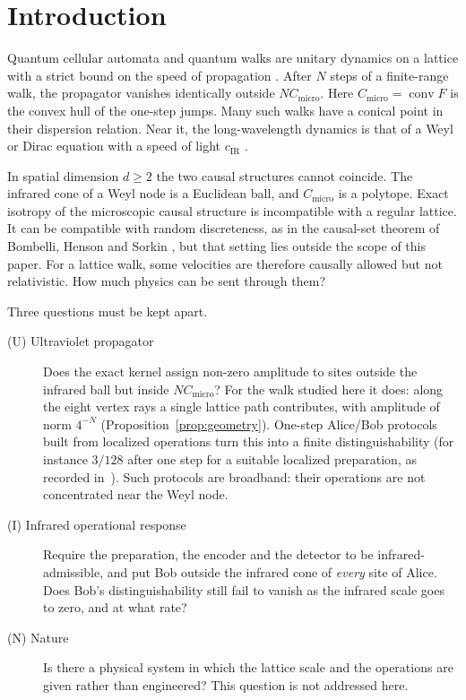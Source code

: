 \documentclass[11pt]{amsart}
\theoremstyle{definition}
\theoremstyle{remark}
\newcommand{\Cmicro}{C_{\mathrm{micro}}}
\newcommand{\cIR}{c_{\mathrm{IR}}}
\begin{document}
\maketitle

\section{Introduction}\label{sec:intro}

Quantum cellular automata and quantum walks are unitary dynamics on a lattice
with a strict bound on the speed of propagation
\cite{SchumacherWerner,Arrighi,Farrelly}.  After $N$ steps of a finite-range
walk, the propagator vanishes identically outside $N\Cmicro$.  Here
$\Cmicro=\operatorname{conv}F$ is the convex hull of the one-step jumps.
Many such walks have a conical point in their dispersion relation.  Near it,
the long-wavelength dynamics is that of a Weyl or Dirac equation with a
speed of light $\cIR$
\cite{BialynickiBirula,DArianoPerinotti,BDPT,DArianoErbaPerinotti}.

In spatial dimension $d\ge2$ the two causal structures cannot coincide.  The
infrared cone of a Weyl node is a Euclidean ball, and $\Cmicro$ is a
polytope.  Exact isotropy of the microscopic causal structure is incompatible
with a regular lattice.  It can be compatible with random discreteness, as in
the causal-set theorem of Bombelli, Henson and Sorkin \cite{BHS}, but that
setting lies outside the scope of this paper.  For a lattice walk, some
velocities are therefore causally allowed but not relativistic.  How much
physics can be sent through them?

Three questions must be kept apart.

\begin{description}
\item[(U) Ultraviolet propagator] Does the exact kernel assign non-zero
  amplitude to sites outside the infrared ball but inside $N\Cmicro$?  For
  the walk studied here it does: along the eight vertex rays a single
  lattice path contributes, with amplitude of norm $4^{-N}$
  (Proposition~\ref{prop:geometry}).  One-step Alice/Bob protocols built
  from localized operations turn this into a finite distinguishability
  (for instance $3/128$ after one step for a suitable localized
  preparation, as recorded in~\cite{Repo}).  Such protocols are broadband:
  their operations are not concentrated near the Weyl node.
\item[(I) Infrared operational response] Require the preparation, the
  encoder and the detector to be infrared-admissible, and put Bob outside
  the infrared cone of \emph{every} site of Alice.  Does Bob's
  distinguishability still fail to vanish as the infrared scale goes to
  zero, and at what rate?
\item[(N) Nature] Is there a physical system in which the lattice scale and
  the operations are given rather than engineered?  This question is not
  addressed here.
\end{description}
\end{document}
